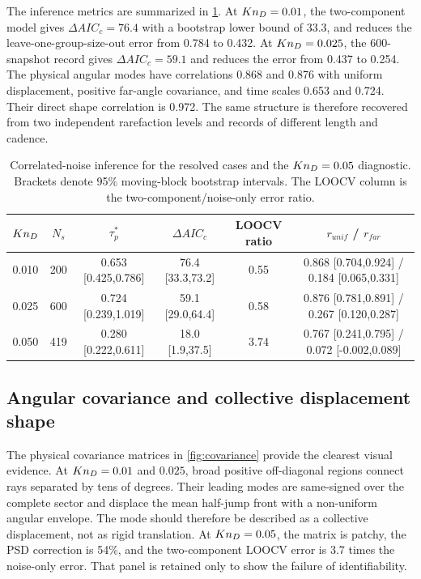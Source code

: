 The inference metrics are summarized in \cref{tab:inference}. At $Kn_D=0.01$, the two-component model gives $\Delta AIC_c=76.4$ with a bootstrap lower bound of 33.3, and reduces the leave-one-group-size-out error from 0.784 to 0.432. At $Kn_D=0.025$, the 600-snapshot record gives $\Delta AIC_c=59.1$ and reduces the error from 0.437 to 0.254. The physical angular modes have correlations 0.868 and 0.876 with uniform displacement, positive far-angle covariance, and time scales 0.653 and 0.724. Their direct shape correlation is 0.972. The same structure is therefore recovered from two independent rarefaction levels and records of different length and cadence.

\begin{table}
\centering
\caption{Correlated-noise inference for the resolved cases and the $Kn_D=0.05$ diagnostic. Brackets denote 95\% moving-block bootstrap intervals. The LOOCV column is the two-component/noise-only error ratio.}
\label{tab:inference}
\small
\begin{tabular}{cccccc}
\toprule
$Kn_D$ & $N_s$ & $\tau_p^*$ & $\Delta AIC_c$ & LOOCV ratio & $r_{unif}$ / $r_{far}$ \\
\midrule
0.010 & 200 & 0.653 [0.425,0.786] & 76.4 [33.3,73.2] & 0.55 & 0.868 [0.704,0.924] / 0.184 [0.065,0.331] \\
0.025 & 600 & 0.724 [0.239,1.019] & 59.1 [29.0,64.4] & 0.58 & 0.876 [0.781,0.891] / 0.267 [0.120,0.287] \\
0.050 & 419 & 0.280 [0.222,0.611] & 18.0 [1.9,37.5] & 3.74 & 0.767 [0.241,0.795] / 0.072 [-0.002,0.089] \\
\bottomrule
\end{tabular}
\end{table}

\subsection{Angular covariance and collective displacement shape}
The physical covariance matrices in \cref{fig:covariance} provide the clearest visual evidence. At $Kn_D=0.01$ and $0.025$, broad positive off-diagonal regions connect rays separated by tens of degrees. Their leading modes are same-signed over the complete sector and displace the mean half-jump front with a non-uniform angular envelope. The mode should therefore be described as a collective displacement, not as rigid translation. At $Kn_D=0.05$, the matrix is patchy, the PSD correction is 54\%, and the two-component LOOCV error is 3.7 times the noise-only error. That panel is retained only to show the failure of identifiability.

